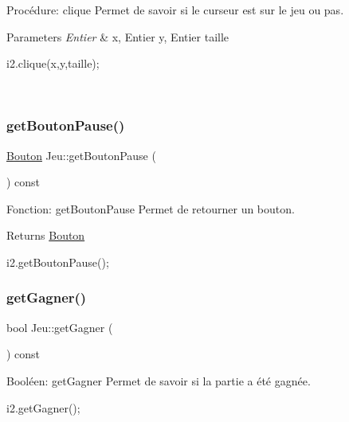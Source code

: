 Procédure\+: clique Permet de savoir si le curseur est sur le jeu ou pas. 


\begin{DoxyParams}{Parameters}
{\em Entier} & x, Entier y, Entier taille 
\begin{DoxyCode}
i2.clique(x,y,taille);
\end{DoxyCode}
 \\
\hline
\end{DoxyParams}
\mbox{\label{classJeu_a19a19081c6f398937f5a5f9b6d606f1f}} 
\subsubsection{\texorpdfstring{get\+Bouton\+Pause()}{getBoutonPause()}}
{\footnotesize\ttfamily \hyperlink{classBouton}{Bouton} Jeu\+::get\+Bouton\+Pause (\begin{DoxyParamCaption}{ }\end{DoxyParamCaption}) const}



Fonction\+: get\+Bouton\+Pause Permet de retourner un bouton. 

\begin{DoxyReturn}{Returns}
\hyperlink{classBouton}{Bouton} 
\begin{DoxyCode}
i2.getBoutonPause();
\end{DoxyCode}
 
\end{DoxyReturn}
\mbox{\label{classJeu_a4656f397fa4ad510a3e5ecceeb4dcc56}} 
\subsubsection{\texorpdfstring{get\+Gagner()}{getGagner()}}
{\footnotesize\ttfamily bool Jeu\+::get\+Gagner (\begin{DoxyParamCaption}{ }\end{DoxyParamCaption}) const}



Booléen\+: get\+Gagner Permet de savoir si la partie a été gagnée. 


\begin{DoxyCode}
i2.getGagner();
\end{DoxyCode}
 \mbox{\label{classJeu_aa6c8ca3f336af956e4f7ba9f630c7e30}} 
